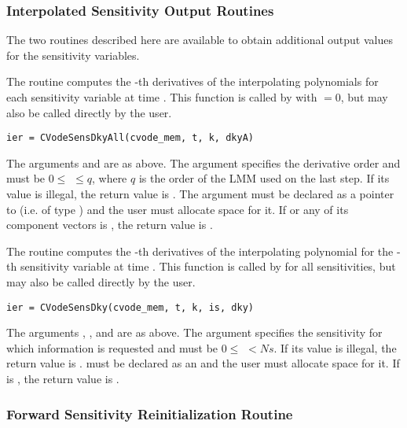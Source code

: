 \subsubsection{Interpolated Sensitivity Output Routines}

The two routines described here are available to obtain additional output values
for the sensitivity variables.

The routine  computes the -th derivatives of the interpolating 
polynomials for each sensitivity variable at time .
This function is called by  with  $= 0$, but may also be called 
directly by the user.
\begin{verbatim}
ier = CVodeSensDkyAll(cvode_mem, t, k, dkyA)
\end{verbatim}

The arguments  and  are as above.
The argument  specifies the derivative order and must be 
$0 \le$  $\le q$, where $q$ is the order of the LMM used on the last step.
If its value is illegal, the return value is .
The argument  must be declared as a pointer to  (i.e. of type
) and the user must allocate space for it. 
If  or any of its component vectors is , the return value is .

The routine  computes the -th derivatives of the interpolating 
polynomial for the -th sensitivity variable at time .
This function is called by  for all sensitivities, but may 
also be called directly by the user.
\begin{verbatim}
ier = CVodeSensDky(cvode_mem, t, k, is, dky)
\end{verbatim}

The arguments , , and  are as above.
The argument  specifies the sensitivity for which information
is requested and must be $0 \le$  $< Ns$. If its value is illegal, the return
value is .
 must be declared as an  and the user
must allocate space for it. If  is , the return value 
is .

\subsubsection{Forward Sensitivity Reinitialization Routine}\label{sss:cvsreinit}

